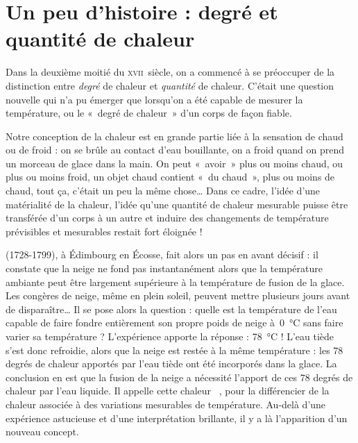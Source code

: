 \atstartofhistorysection
\section[Un peu d’histoire : degré et quantité  de chaleur]{Un peu d’histoire :\onlyamphibook{\\} degré et quantité  de chaleur}
\label{ch_histoire_quantite_chaleur_depondt}


	Dans la deuxième moitié du \textsc{xvii}\ieme\ siècle, on a commencé à se préoccuper de la distinction entre \emph{degré} de chaleur et \emph{quantité} de chaleur. C'était une question nouvelle qui n'a pu émerger que lorsqu'on a été capable de mesurer la température, ou le «~degré de chaleur~» d'un corps de façon fiable.

	Notre conception de la chaleur est en grande partie liée à la sensation de chaud ou de froid : on se brûle au contact d'eau bouillante, on a froid quand on prend un morceau de glace dans la main. On peut «~avoir~» plus ou moins chaud, ou plus ou moins froid, un objet chaud contient «~du chaud~», plus ou moins de chaud, tout ça, c'était un peu la même chose… Dans ce cadre, l'idée d'une matérialité de la chaleur, l'idée qu'une quantité de chaleur mesurable puisse être transférée d'un corps à un autre et induire des changements de température prévisibles et mesurables restait fort éloignée !

	 (1728-1799), à Édimbourg en Écosse, fait alors un pas en avant décisif : il constate que la neige ne fond pas instantanément alors que la température ambiante peut être largement supérieure à la température de fusion de la glace. Les congères de neige, même en plein soleil, peuvent mettre plusieurs jours avant de disparaître… Il se pose alors la question : quelle est la température de l’eau capable de faire fondre entièrement son propre poids de neige à~\SI{0}{\degreeCelsius} sans faire varier sa température ? L’expérience apporte la réponse : \SI{78}{\degreeCelsius} ! L'eau tiède s'est donc refroidie, alors que la neige est restée à la même température : les 78 degrés de chaleur apportés par l'eau tiède ont été incorporés dans la glace. La conclusion en est que la fusion de la neige a nécessité l'apport de ces 78 degrés de chaleur par l'eau liquide. Il appelle cette chaleur ~\cite{locqueneux1996}, pour la différencier de la chaleur  associée à des variations mesurables de température. Au-delà d'une expérience astucieuse et d'une interprétation brillante, il y a là l'apparition d'un nouveau concept.

